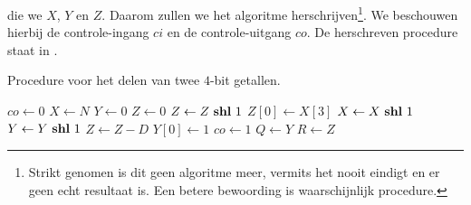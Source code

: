die we $X$, $Y$ en $Z$. Daarom zullen we het algoritme herschrijven\footnote{Strikt genomen is dit geen algoritme meer, vermits het nooit eindigt en er geen echt resultaat is. Een betere bewoording is waarschijnlijk procedure.}. We beschouwen hierbij de controle-ingang $ci$ en de controle-uitgang $co$. De herschreven procedure staat in .
\begin{algorithm}[hbt]
\caption{Procedure voor het delen van twee $4$-bit getallen.}\label{alg:devisionFSMDRev}
\begin{algorithmic}[1]
\Repeat\label{algl:s1start}
\State $co\gets 0$
\State $X\gets N$
\State $Y\gets 0$
\State $Z\gets 0$
\label{algl:s1stop}
\label{algl:s2start}
\State $Z\gets Z\mbox{ \textbf{shl} }{}1$
\State $Z\left[0\right]\gets X\left[3\right]$
\State $X\gets X\mbox{ \textbf{shl} }{}1$
\State $Y\gets Y\mbox{ \textbf{shl} }{}1$
\label{algl:devisionFSMDComp}
\State $Z\gets Z-D$\label{algl:devisionFSMDSub}
\State $Y\left[0\right]\gets 1$
\EndIf
\EndFor\label{algl:s2stop}
\Repeat\label{algl:s3start}
\State $co\gets 1$
\State $Q\gets Y$
\State $R\gets Z$
\label{algl:s3stop}
\EndWhile
\EndProcedure
\end{algorithmic}
\end{algorithm}
